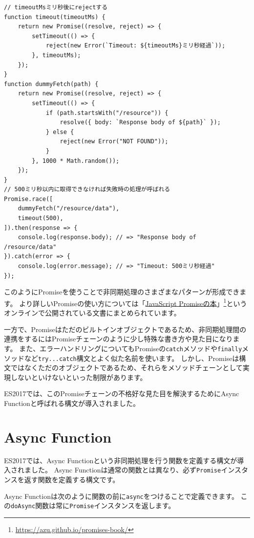 \begin{lstlisting}
// timeoutMsミリ秒後にrejectする
function timeout(timeoutMs) {
    return new Promise((resolve, reject) => {
        setTimeout(() => {
            reject(new Error(`Timeout: ${timeoutMs}ミリ秒経過`));
        }, timeoutMs);
    });
}
function dummyFetch(path) {
    return new Promise((resolve, reject) => {
        setTimeout(() => {
            if (path.startsWith("/resource")) {
                resolve({ body: `Response body of ${path}` });
            } else {
                reject(new Error("NOT FOUND"));
            }
        }, 1000 * Math.random());
    });
}
// 500ミリ秒以内に取得できなければ失敗時の処理が呼ばれる
Promise.race([
    dummyFetch("/resource/data"),
    timeout(500),
]).then(response => {
    console.log(response.body); // => "Response body of /resource/data"
}).catch(error => {
    console.log(error.message); // => "Timeout: 500ミリ秒経過"
});
\end{lstlisting}

このようにPromiseを使うことで非同期処理のさまざまなパターンが形成できます。
より詳しいPromiseの使い方については「\href{https://azu.github.io/promises-book/}{JavaScript
Promiseの本}」\footnote{\url{https://azu.github.io/promises-book/}}というオンラインで公開されている文書にまとめられています。

一方で、Promiseはただのビルトインオブジェクトであるため、非同期処理間の連携をするにはPromiseチェーンのように少し特殊な書き方や見た目になります。
また、エラーハンドリングについてもPromiseの\texttt{catch}メソッドや\texttt{finally}メソッドなど\texttt{try...catch}構文とよく似た名前を使います。
しかし、Promiseは構文ではなくただのオブジェクトであるため、それらをメソッドチェーンとして実現しないといけないといった制限があります。

ES2017では、このPromiseチェーンの不格好な見た目を解決するためにAsync
Functionと呼ばれる構文が導入されました。

\hypertarget{async-function}{%
\section[Async Function]{Async Function\,\protect{}}\label{async-function}}

ES2017では、Async
Functionという非同期処理を行う関数を定義する構文が導入されました。 Async
Functionは通常の関数とは異なり、必ず\texttt{Promise}インスタンスを返す関数を定義する構文です。

Async
Functionは次のように関数の前に\texttt{async}をつけることで定義できます。
この\texttt{doAsync}関数は常に\texttt{Promise}インスタンスを返します。

